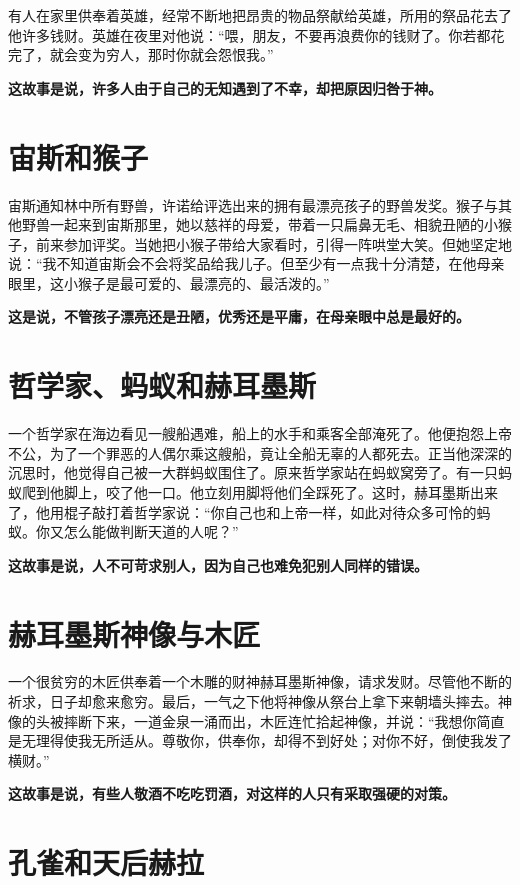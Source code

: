 有人在家里供奉着英雄，经常不断地把昂贵的物品祭献给英雄，所用的祭品花去了他许多钱财。英雄在夜里对他说：“喂，朋友，不要再浪费你的钱财了。你若都花完了，就会变为穷人，那时你就会怨恨我。”

{\bfseries \color{red}这故事是说，许多人由于自己的无知遇到了不幸，却把原因归咎于神。}

\section{宙斯和猴子}

宙斯通知林中所有野兽，许诺给评选出来的拥有最漂亮孩子的野兽发奖。猴子与其他野兽一起来到宙斯那里，她以慈祥的母爱，带着一只扁鼻无毛、相貌丑陋的小猴子，前来参加评奖。当她把小猴子带给大家看时，引得一阵哄堂大笑。但她坚定地说：“我不知道宙斯会不会将奖品给我儿子。但至少有一点我十分清楚，在他母亲眼里，这小猴子是最可爱的、最漂亮的、最活泼的。”

{\bfseries \color{red}这是说，不管孩子漂亮还是丑陋，优秀还是平庸，在母亲眼中总是最好的。}

\section{哲学家、蚂蚁和赫耳墨斯}

一个哲学家在海边看见一艘船遇难，船上的水手和乘客全部淹死了。他便抱怨上帝不公，为了一个罪恶的人偶尔乘这艘船，竟让全船无辜的人都死去。正当他深深的沉思时，他觉得自己被一大群蚂蚁围住了。原来哲学家站在蚂蚁窝旁了。有一只蚂蚁爬到他脚上，咬了他一口。他立刻用脚将他们全踩死了。这时，赫耳墨斯出来了，他用棍子敲打着哲学家说：“你自己也和上帝一样，如此对待众多可怜的蚂蚁。你又怎么能做判断天道的人呢？”

{\bfseries \color{red}这故事是说，人不可苛求别人，因为自己也难免犯别人同样的错误。}

\section{赫耳墨斯神像与木匠}

一个很贫穷的木匠供奉着一个木雕的财神赫耳墨斯神像，请求发财。尽管他不断的祈求，日子却愈来愈穷。最后，一气之下他将神像从祭台上拿下来朝墙头摔去。神像的头被摔断下来，一道金泉一涌而出，木匠连忙拾起神像，并说：“我想你简直是无理得使我无所适从。尊敬你，供奉你，却得不到好处；对你不好，倒使我发了横财。”

{\bfseries \color{red}这故事是说，有些人敬酒不吃吃罚酒，对这样的人只有采取强硬的对策。}

\section{孔雀和天后赫拉}

